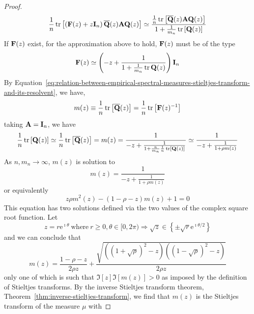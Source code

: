 \begin{proof}
	\begin{equation*}
		\frac{1}{n}\operatorname{tr}\left[\left({\bf F}(z)+z\mathbf{I}_{n}\right)\overline{{\bf Q}}(z){\bf A}{\bf Q}(z)\right]\simeq\frac{\frac{1}{n}\operatorname{tr}\left[\overline{{\bf Q}}(z){\bf A}{\bf Q}(z)\right]}{1+\frac{1}{m_{n}}\operatorname{tr}\left[{\bf Q}(z)\right]}
	\end{equation*}
	If ${\bf F}(z)$ exist, for the approximation above to hold, ${\bf F}(z)$ must be of the type
	\begin{equation*}
		{\bf F}(z)\simeq\left(-z+\frac{1}{1+\frac{1}{m_{n}}\operatorname{tr}{\bf Q}(z)}\right)\mathbf{I}_{n}
	\end{equation*}
	By Equation~\ref{eq:relation-between-empirical-spectral-measures-stieltjes-transform-and-its-resolvent}, we have,
	\begin{equation*}
		m(z)\equiv\frac{1}{n}\operatorname{tr}\left[\overline{{\bf Q}}(z)\right]=\frac{1}{n}\operatorname{tr}\left[{\bf F}(z)^{-1}\right]
	\end{equation*}
	taking ${\bf A}=\mathbf{I}_{n}$, we have
	\begin{equation*}
		\frac{1}{n}\operatorname{tr}\left[{\bf Q}(z)\right]\simeq\frac{1}{n}\operatorname{tr}\left[\overline{{\bf Q}}(z)\right]=m(z)=\frac{1}{-z+\frac{1}{1+\frac{n}{m_{n}}\frac{1}{n}\operatorname{tr}\left[{\bf Q}(z)\right]}}\simeq\frac{1}{-z+\frac{1}{1+\rho m(z)}}
	\end{equation*}
	As $n,m_{n}\rightarrow\infty$, $m(z)$ is solution to
	\begin{equation*}
		m(z)=\frac{1}{-z+\frac{1}{1+\rho m(z)}}
	\end{equation*}
	or equivalently
	\begin{equation*}
		z\rho m^{2}(z)-(1-\rho-z)m(z)+1=0
	\end{equation*}
	This equation has two solutions defined via the two values of the complex square root function. Let
	\begin{equation*}
		z=r\mathrm{e}^{\imath\theta}\ \text{where}\ r\geq 0,\theta\in[0,2\pi)\Rightarrow\sqrt{z}\in\left\{\pm\sqrt{r}\mathrm{e}^{\imath\theta/2}\right\}
	\end{equation*}
	and we can conclude that
	\begin{equation*}
		m(z)=\frac{1-\rho-z}{2\rho z}+\frac{\sqrt{\left((1+\sqrt{\rho})^{2}-z\right)\left((1-\sqrt{\rho})^{2}-z\right)}}{2\rho z}
	\end{equation*}
	only one of which is such that $\Im[z]\Im[m(z)]>0$ as imposed by the definition of Stieltjes transforms. By the inverse Stieltjes transform theorem, Theorem~\ref{thm:inverse-stieltjes-transform}, we find that $m(z)$ is the Stieltjes transform of the measure $\mu$ with

\end{proof}
